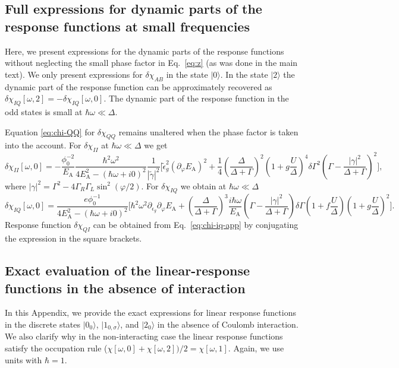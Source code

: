 \documentclass[aps,reprint,longbibliography, prb]{revtex4-2}
\begin{document}
\subsection{Full expressions for dynamic parts of the response functions at small frequencies\label{app:full-expr}}
Here, we present expressions for the dynamic parts of the response functions without neglecting the small phase factor in Eq.~\eqref{eq:z} (as was done in the main text). We only present expressions for $\delta\chi_{AB}$ in the state $|0\rangle$. In the state $|2\rangle$ the dynamic part of the response function can be approximately recovered as $\delta\chi_{IQ}[\omega, 2]= -\delta\chi_{IQ}[\omega,0]$. The dynamic part of the response function in the odd states is small at $\hbar\omega\ll\Delta$.

Equation \eqref{eq:chi-QQ} for $\delta\chi_{QQ}$ remains unaltered when the phase factor is taken into the account. For $\delta\chi_{II}$ at $\hbar\omega\ll\Delta$ we get
\begin{equation}
    \delta\chi_{II}[\omega, 0] = -\frac{\phi_0^{-2}}{E_\mathrm{A}} \frac{\hbar^2\omega^2}{4E_\mathrm{A}^2-(\hbar\omega+i0)^2}\frac{1}{|\tilde{\gamma}|^2}\Bigg[\tilde{\epsilon}_g^2 (\partial_\varphi E_\mathrm{A})^2   +\frac{1}{4}\left(\frac{\Delta}{\Delta+\Gamma}\right)^2\left(1+g \frac{U}{\Delta}\right)^4\delta\Gamma^2\left(\Gamma - \frac{|\gamma|^2}{\Delta+\Gamma}\right)^2\Bigg],
\end{equation}
where $|\gamma|^2 = \Gamma^2 - 4\Gamma_R\Gamma_L \sin^2(\varphi/2)$. For $\delta\chi_{IQ}$ we obtain at $\hbar\omega \ll \Delta$
\begin{equation}
\label{eq:chi-iq-app}
    \delta\chi_{IQ}[\omega, 0] = \frac{e\phi_0^{-1}}{4 E_\mathrm{A}^2 - (\hbar\omega + i0)^2}\Bigg[\hbar^2\omega^2 \partial_{\epsilon_g}\partial_{\varphi} E_{\mathrm{A}}+ \left(\frac{\Delta}{\Delta + \Gamma}\right)^3\frac{i\hbar\omega}{E_{\mathrm{A}}}\left(\Gamma - \frac{|\gamma|^2}{\Delta+\Gamma}\right)\delta\Gamma\left(1+f \frac{U}{\Delta}\right)\left(1+g \frac{U}{\Delta}\right)^2\Bigg].
\end{equation}
Response function $\delta\chi_{QI}$ can be obtained from Eq.~\eqref{eq:chi-iq-app} by conjugating the expression in the square brackets.
\subsection{Exact evaluation of the linear-response functions in the absence of interaction}
\label{sec:app-exact}
In this Appendix, we provide the exact expressions for linear response functions in the discrete states $|0_0\rangle$, $|1_{0,\sigma}\rangle$, and $|2_0\rangle$ in the absence of Coulomb interaction. We also clarify why in the non-interacting  case the linear response functions satisfy the occupation rule ($\chi[\omega, 0]+\chi[\omega, 2])/2 = \chi[\omega, 1]$. Again, we use units with $\hbar = 1$.
\end{document}

